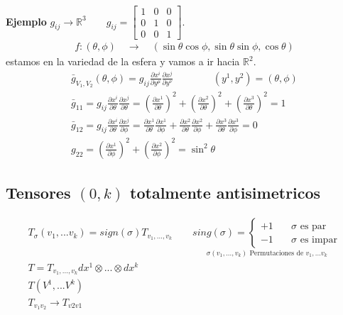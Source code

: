 \documentclass{article}
\begin{document}
\textbf{Ejemplo } $ g _{ij } \rightarrow \mathbb{R}^3 \qquad g _{ij}  = \begin{bmatrix}
    1 & 0 & 0 \\
    0 & 1  & 0 \\
    0 & 0 & 1
\end{bmatrix}  $. 
\begin{gather*}
  f: (\theta, \phi ) \quad \rightarrow \quad (\sin{\theta} \cos{\phi }, \sin{\theta}\sin{\phi }, \cos{\theta}) 
\end{gather*}
estamos en la variedad de la esfera y vamos a ir hacia $ \mathbb{R}^2  $. 
\begin{gather*}
  \bar g _{V_1,V_2 } (\theta, \phi ) = g _{ij } \frac{\partial x ^i  }{\partial y^\mu }\frac{\partial x^j  }{\partial y^\nu }  \qquad \qquad (y^1,y^2 ) = (\theta, \phi )\\
  \bar g _{11} = g _{ij } \frac{\partial x^i  }{\partial \theta }\frac{\partial x^j  }{\partial \theta } = \left(\frac{\partial x^1  }{\partial \theta}\right)^2 + \left(\frac{\partial x^2  }{\partial \theta}\right)^2 + \left(\frac{\partial x^3  }{\partial \theta}\right)^2 = 1\\
  \bar g _{12 }  = g _{ij } \frac{\partial x^i  }{\partial \theta } \frac{\partial x^j  }{\partial \phi } = \frac{\partial x^1  }{\partial \theta }\frac{\partial x^1  }{\partial \phi } + \frac{\partial x^2  }{\partial \theta }\frac{\partial x^2  }{\partial \phi } + \frac{\partial x^3  }{\partial \theta }\frac{\partial x^3  }{\partial \phi } = 0 \\
  g _{22 }  = \left(\frac{\partial x^1  }{\partial \phi}\right)^2 + \left(\frac{\partial x^2  }{\partial \phi}\right)^2 = \sin^2{\theta }
\end{gather*}

\subsection{Tensores $ (0,k)  $ totalmente antisimetricos }
\begin{gather*}
  T _{\sigma } (v_1,...v_k) = sign(\sigma) T _{v_1,...,v_k } \qquad \underset{\sigma(v_1,...,v_k ) \text{ Permutaciones de }v_1,...v_k}{ sing(\sigma) =
     \begin{cases}
       +1 &\quad \sigma \text{ es par }\\
       -1  &\quad \sigma \text{ es impar}
   \end{cases}}\\
  T = T _{v_1,...,v_k  }  dx^1 \otimes ... \otimes dx^k\\
  T(V^1,...V^k)\\
  T _{v_1v_2} \rightarrow T _{v2v1}  
\end{gather*}
\end{document}
